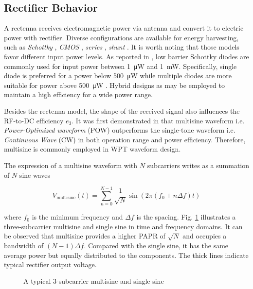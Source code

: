 \subsection{Rectifier Behavior}\label{sec:rectifier-behavior}
A rectenna receives electromagnetic power via antenna and convert it to electric power with rectifier. Diverse configurations are available for energy harvesting, such as \textit{Schottky} \cite{Akkermans2005, Boaventura2013}, \textit{CMOS} \cite{Stoopman2014, Valenta2014}, \textit{series} \cite{Georgiadis2011, Collado2013}, \textit{shunt} \cite{McSpadden1998, Guo2012}. It is worth noting that those models favor different input power levels. As reported in \cite{Valenta2014, Costanzo2016}, low barrier Schottky diodes are commonly used for input power between \SI{1}{\uW} and \SI{1}{\mW}. Specifically, single diode is preferred for a power below \SI{500}{\uW} while multiple diodes are more suitable for power above \SI{500}{\uW} \cite{Clerckx2019}. Hybrid designs as \cite{Sun2013} may be employed to maintain a high efficiency for a wide power range.

Besides the rectenna model, the shape of the received signal also influences the RF-to-DC efficiency ${e_3}$. It was first demonstrated in \cite{Trotter2009} that multisine waveform i.e. \textit{Power-Optimized waveform} (POW) outperforms the single-tone waveform i.e. \textit{Continuous Wave} (CW) in both operation range and power efficiency. Therefore, multisine is commonly employed in WPT waveform design.

The expression of a multisine waveform with $N$ subcarriers writes as a summation of $N$ sine waves

\begin{equation}\label{eqn:multisine}
  {V_{{\text{multisine}}}}(t) = \sum\limits_{n = 0}^{N - 1} {\frac{1}{{\sqrt N }}} \sin \left( {2\pi \left( {{f_{\text{0}}} + n\Delta f} \right)t} \right)
\end{equation}

where ${{f_{\text{0}}}}$ is the minimum frequency and ${\Delta f}$ is the spacing. Fig. \ref{fig:waveform_comparison} \cite{Trotter2009} illustrates a three-subcarrier multisine and single sine in time and frequency domains. It can be observed that multisine provides a higher PAPR of ${\sqrt N }$ and occupies a bandwidth of $(N - 1) \Delta f$. Compared with the single sine, it has the same average power but equally distributed to the components. The thick lines indicate typical rectifier output voltage.

\begin{figure}[ht]
  \centering
  \caption{A typical 3-subcarrier multisine and single sine \cite{Trotter2009}}
  \label{fig:waveform_comparison}
\end{figure}

